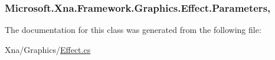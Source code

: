 \subsubsection[{Parameters}]{ Microsoft.\+Xna.\+Framework.\+Graphics.\+Effect.\+Parameters\hspace{0.3cm}{\ttfamily [get]}, {\ttfamily [set]}}\label{class_microsoft_1_1_xna_1_1_framework_1_1_graphics_1_1_effect_a47f593d18591757a0cc2ae630888fbdb}


The documentation for this class was generated from the following file\+:\begin{DoxyCompactItemize}
\item 
Xna/\+Graphics/\hyperlink{_effect_8cs}{Effect.\+cs}\end{DoxyCompactItemize}
